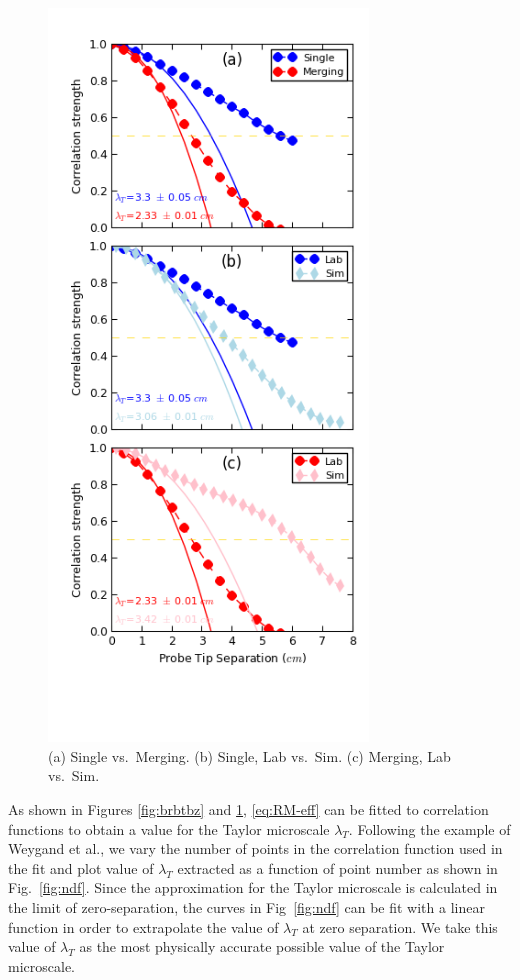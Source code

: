\documentclass[aip,prl,amsmath,amssymb,reprint,superscriptaddress]{revtex4-1} %
\begin{document}
\begin{figure}[!htbp]
\centering
\includegraphics[width=8.5cm]{Images/comparisons.png}
\caption{\label{fig:comparisons} (a) Single vs.\ Merging. (b) Single, Lab vs.\ Sim. (c) Merging, Lab vs.\ Sim.}
\end{figure}

As shown in Figures \ref{fig:brbtbz} and \ref{fig:comparisons}, \eqref{eq:RM-eff} can be fitted to correlation functions to obtain a value for the Taylor microscale $\lambda_T$. 
Following the example of Weygand et al.\cite{Weygand07}, we vary the number of points in the correlation function used in the fit and plot value of $\lambda_{T}$ extracted as a function of point number as shown in Fig.~\ref{fig:ndf}. Since the approximation for the Taylor microscale is calculated in the limit of zero-separation, the curves in Fig~\ref{fig:ndf} can be fit with a linear function in order to extrapolate the value of $\lambda_{T}$ at zero separation. We take this value of $\lambda_{T}$ as the most physically accurate possible value of the Taylor microscale.
\end{document}

